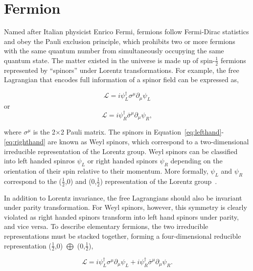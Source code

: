 \section{Fermion}
\label{sec:Fermion}

Named after Italian physicist Enrico Fermi, fermions follow Fermi-Dirac statistics and obey the Pauli exclusion principle, which prohibits two or more fermions with the same quantum number from simultaneously occupying the same quantum state. The matter existed in the universe is made up of spin-$\frac{1}{2}$ fermions represented by ``spinors'' under Lorentz transformations. For example, the free Lagrangian that encodes full information of a spinor field can be expressed as,

\begin{equation}
\label{eq:lefthand}
\mathcal{L}=i\psi_{L}^{\dagger}\sigma^{\mu}\partial_{\mu}\psi_{L}
\end{equation}
or
\begin{equation}
\label{eq:righthand}
\mathcal{L}=i\psi_{R}^{\dagger}\bar{\sigma}^{\mu}\partial_{\mu}\psi_{R},
\end{equation}

where $\sigma^{\mu}$ is the 2$\times$2 Pauli matrix. The spinors in Equation~\ref{eq:lefthand}-\ref{eq:righthand} are known as Weyl spinors, which correspond to a two-dimensional irreducible representation of the Lorentz group. Weyl spinors can be classified into left handed spinros $\psi_{L}$ or right handed spinors $\psi_{R}$ depending on the orientation of their spin relative to their momentum. More formally, $\psi_{L}$ and $\psi_{R}$ correspond to the ($\frac{1}{2}$,0) and (0,$\frac{1}{2}$) representation of the Lorentz group~\cite{zee:group}.

In addition to Lorentz invariance, the free Lagrangians should also be invariant under parity transformation. For Weyl spinors, however, this symmetry is clearly violated as right handed spinors transform into left hand spinors under parity, and vice versa. To describe elementary fermions, the two irreducible representations must be stacked together, forming a four-dimensional reducible representation ($\frac{1}{2}$,0) $\bigoplus$ (0,$\frac{1}{2}$),

\begin{equation}
\label{eq:leftandright}
\mathcal{L}=i\psi_{L}^{\dagger}\sigma^{\mu}\partial_{\mu}\psi_{L}+i\psi_{R}^{\dagger}\bar{\sigma}^{\mu}\partial_{\mu}\psi_{R}.
\end{equation}

